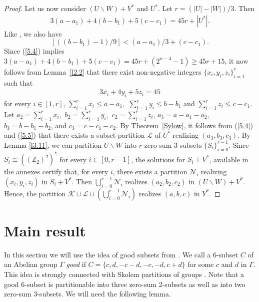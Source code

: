 \documentclass[final]{dmtcs-episciences}
\newcommand{\zet}{\mathbb{Z}}
\begin{document}
\begin{proof}
Let us now consider $(U\backslash W)+V^*$ and $U^*$. Let $r=(|U|-|W|)/3$. Then
\begin{align} \label{5.4}
3(a-a_{1})+4(b-b_{1})+5(c-c_{1})=45r+|U^*|.\end{align}
Like \citet{Egawa}, we also have
$$[((b-b_{1})-1)/9]<(a-a_{1})/3+(c-c_{1}).$$
Since (\ref{5.4}) implies $3(a-a_{1})+4(b-b_{1})+5(c-c_{1})=45r+(2^{n-4}-1)\geq 45r+15$, it now
follows from Lemma~\ref{l2.2} that there exist non-negative integers $\{x_{i},y_{i},z_{i}\}_{i=1}^{r}$ such that
\begin{align}\label{5.5}
3x_{i}+4y_{i}+5z_{i}=45\end{align}
for every  {$i\in[1,r]$},  $\sum_{i=1}^{r} x_{i}\leq a-a_{1},$ $\sum_{i=1}^{r} y_{i}\leq b-b_{1}$ and $\sum_{i=1}^{r} z_{i}\leq c-c_{1}$. Let $a_{2}=\sum_{i=1}^{r} x_{i},$ $b_{2}=\sum_{i=1}^{r} y_{i},$ $c_{2}=\sum_{i=1}^{r} z_{i}$,
$a_{3}=a-a_{1}-a_{2},$ $b_{3}=b-b_{1}-b_{2}$, and $c_{3}=c-c_{1}-c_{2}$. By Theorem~\ref{Sylow}, it follows from (\ref{5.4}) and (\ref{5.5}) that there exists a subset partition $\mathcal{L}$ of $U^*$ realizing $(a_{3}, b_{3}, c_{3})$.
By Lemma \ref{l3.11}, we can partition $U\backslash W$ into $r$ zero-sum $3$-subsets $\{S_{i}\}_{i=0}^{r-1}$. Since $S_i\cong ((\zet_2)^2)^*$ for every  {$i\in[0,r-1]$}, the solutions for $S_{i}+V^*$,  available in the annexes certify that, for every $i$, there exists a partition $\mathcal{N}_i$ realizing $(x_{i}, y_{i}, z_{i})$ in  $S_{i}+V^*$. %
Then $\bigcup_{i=0}^{r-1}\mathcal{N}_{i}$ realizes $(a_{2}, b_{2}, c_{2})$ in $(U\backslash W)+V^*$. Hence, the partition $\mathcal{K}\cup\mathcal{ L}\cup(\bigcup_{i=0}^{r-1}\mathcal{N}_{i})$ realizes $(a, b, c)$ in $Y^*$.
\end{proof}


\section{Main result}\label{sec:mr}
 In this section we will use the idea of good subsets from \citet{Zeng}. We call a 6-subset $C$ of an Abelian group $\Gamma$ \textit{good} if $C = \{c, d,-c -d,-c,-d, c + d\}$ for some $c$ and $d$ in $\Gamma$. This idea is strongly connected with Skolem partitions of groups \citep{Tannenbaum1}. Note that a good 6-subset is partitionable into three zero-sum 2-subsets
as well as into two zero-sum 3-subsets. We will need the following lemma.
\end{document}

